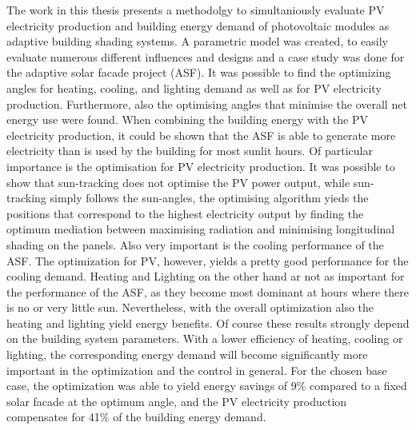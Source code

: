 The work in this thesis presents a methodolgy to simultaniously evaluate PV electricity production and building energy demand of photovoltaic modules as adaptive building shading systems. A parametric model was created, to easily evaluate numerous different influences and designs and a case study was done for the adaptive solar facade project (ASF). It was possible to find the optimizing angles for heating, cooling, and lighting demand as well as for PV electricity production. Furthermore, also the optimising angles that minimise the overall net energy use were found. When combining the building energy with the PV electricity production, it could be shown that the ASF is able to generate more electricity than is used by the building for most sunlit hours. Of particular importance is the optimisation for PV electricity production. It was possible to show that sun-tracking does not optimise the PV power output, while sun-tracking simply follows the sun-angles, the optimising algorithm yieds the positions that correspond to the highest electricity output by finding the optimum mediation between maximising radiation and minimising longitudinal shading on the panels. Also very important is the cooling performance of the ASF. The optimization for PV, however, yields a pretty good performance for the cooling demand. Heating and Lighting on the other hand ar not as important for the performance of the ASF, as they become most dominant at hours where there is no or very little sun. Nevertheless, with the overall optimization also the heating and lighting yield energy benefits. Of course these results strongly depend on the building system parameters. With a lower efficiency of heating, cooling or lighting, the corresponding energy demand will become significantly more important in the optimization and the control in general. For the chosen base case, the optimization was able to yield energy savings of 9\% compared to a fixed solar facade at the optimum angle, and the PV electricity production compensates for 41\% of the building energy demand. 

